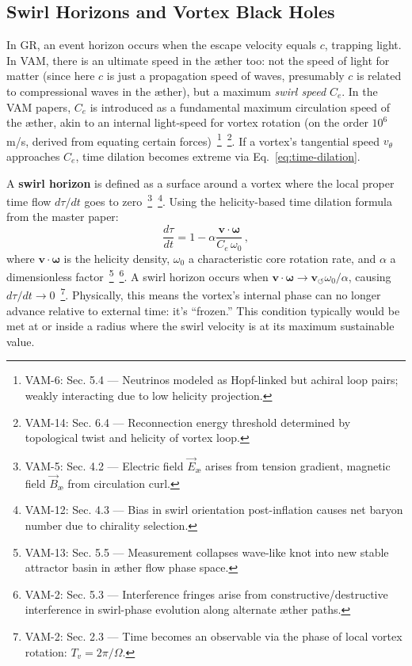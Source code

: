\documentclass[a4paper,12pt]{article}
\begin{document}
    \subsection{Swirl Horizons and Vortex Black Holes}
    In GR, an event horizon occurs when the escape velocity equals $c$, trapping light. In VAM, there is an ultimate speed in the æther too: not the speed of light for matter (since here $c$ is just a propagation speed of waves, presumably $c$ is related to compressional waves in the æther), but a maximum \emph{swirl speed} $C_e$. In the VAM papers, $C_e$ is introduced as a fundamental maximum circulation speed of the æther, akin to an internal light-speed for vortex rotation (on the order $10^6$ m/s, derived from equating certain forces)~\footnote{VAM-6: Sec. 5.4 — Neutrinos modeled as Hopf-linked but achiral loop pairs; weakly interacting due to low helicity projection.}~\footnote{VAM-14: Sec. 6.4 — Reconnection energy threshold determined by topological twist and helicity of vortex loop.}. If a vortex’s tangential speed $v_\theta$ approaches $C_e$, time dilation becomes extreme via Eq.~\eqref{eq:time-dilation}.

    A \textbf{swirl horizon} is defined as a surface around a vortex where the local proper time flow $d\tau/dt$ goes to zero~\footnote{VAM-5: Sec. 4.2 — Electric field $\vec{E}_{\text{\ae}}$ arises from tension gradient, magnetic field $\vec{B}_{\text{\ae}}$ from circulation curl.}~\footnote{VAM-12: Sec. 4.3 — Bias in swirl orientation post-inflation causes net baryon number due to chirality selection.}. Using the helicity-based time dilation formula from the master paper:
    \begin{equation}
        \frac{d\tau}{dt} = 1 - \alpha \frac{\mathbf{v}\cdot\boldsymbol{\omega}}{C_e\,\omega_0}\,,
        \label{eq:helicity-dilation}
    \end{equation}
    where $\mathbf{v}\cdot\boldsymbol{\omega}$ is the helicity density, $\omega_0$ a characteristic core rotation rate, and $\alpha$ a dimensionless factor~\footnote{VAM-13: Sec. 5.5 — Measurement collapses wave-like knot into new stable attractor basin in æther flow phase space.}~\footnote{VAM-2: Sec. 5.3 — Interference fringes arise from constructive/destructive interference in swirl-phase evolution along alternate æther paths.}. A swirl horizon occurs when $\mathbf{v}\cdot\boldsymbol{\omega} \to \mathbf{v}_{\scriptscriptstyle\boldsymbol{\circlearrowleft}} \omega_0/\alpha$, causing $d\tau/dt \to 0$~\footnote{VAM-2: Sec. 2.3 — Time becomes an observable via the phase of local vortex rotation: $T_v = 2\pi/\Omega$.}. Physically, this means the vortex’s internal phase can no longer advance relative to external time: it’s “frozen.” This condition typically would be met at or inside a radius where the swirl velocity is at its maximum sustainable value.
\end{document}
